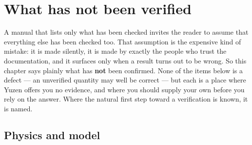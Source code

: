 \chapter{What has not been verified}
\label{ch:notverified}

A manual that lists only what has been checked invites the reader to assume
that everything else has been checked too. That assumption is the expensive
kind of mistake: it is made silently, it is made by exactly the people who
trust the documentation, and it surfaces only when a result turns out to be
wrong. So this chapter says plainly what has \textbf{not} been confirmed. None
of the items below is a defect --- an unverified quantity may well be correct
--- but each is a place where Yuzen offers you no evidence, and where you
should supply your own before you rely on the answer. Where the natural first
step toward a verification is known, it is named.

\section{Physics and model}
\label{sec:notverified:physics}

